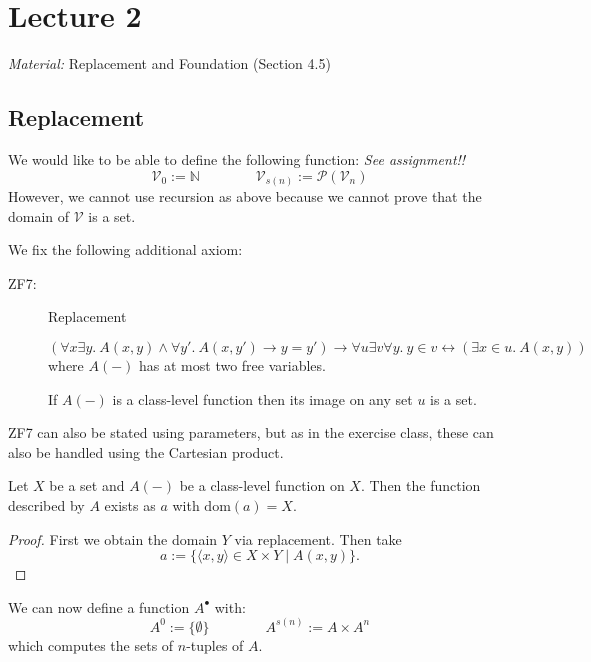 \documentclass{whrartcl}
\newcommand{\NN}{\mathbb{N}}
\newcommand{\Vv}{\mathcal{V}}
\newcommand{\pow}{\mathcal{P}}
\newcommand{\dom}{\text{dom}}
\begin{document}
\newpage

\section{Lecture 2}

\emph{Material:} Replacement and Foundation (Section 4.5)

\subsection{Replacement}

We would like to be able to define the following function: \emph{See assignment!!}
\[
  \Vv_0 := \NN \qquad \qquad \Vv_{s(n)} := \pow(\Vv_n)
\]
However, we cannot use recursion as above because we cannot prove that the
domain of $\Vv$ is a set.

\begin{definition}
  We fix the following additional axiom:
  \begin{description}
  \item[ZF7:] Replacement

    $(\forall x \exists y.~A(x,y) \wedge \forall y'.~A(x, y') \to y = y') \to
    \forall u \exists v \forall y.~y \in v \leftrightarrow (\exists x \in
    u.~A(x, y))$ where $A(-)$ has at most two free variables.

    If $A(-)$ is a class-level function then its image on any set $u$ is a set.
  \end{description}
\end{definition}

\begin{remark}
  ZF7 can also be stated using parameters, but as in the exercise class, these
  can also be handled using the Cartesian product.
\end{remark}

\begin{proposition}
  Let $X$ be a set and $A(-)$ be a class-level function on $X$. Then the
  function described by $A$ exists as $a$ with $\dom(a) = X$.
\end{proposition}
\begin{proof}
  First we obtain the domain $Y$ via replacement. Then take
  \[
    a := \{\langle x, y \rangle \in X \times Y \mid A(x, y)\}.
  \]
\end{proof}

\begin{example}
  We can now define a function $A^\bullet$ with:
  \[ A^0 := \{\emptyset\} \qquad \qquad A^{s(n)} := A \times A^n\]
  which computes the sets of $n$-tuples of $A$.
\end{example}
\end{document}
